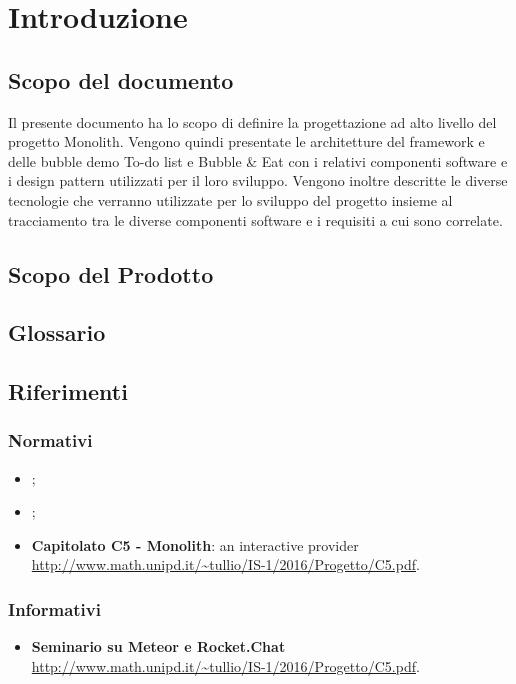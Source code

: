 \section{Introduzione}

\subsection{Scopo del documento}
Il presente documento ha lo scopo di definire la progettazione ad alto livello del progetto Monolith. Vengono quindi presentate le architetture del framework e delle bubble demo To-do list e Bubble \& Eat con i relativi componenti software e i design pattern utilizzati per il loro sviluppo. Vengono inoltre descritte le diverse tecnologie che verranno utilizzate per lo sviluppo del progetto insieme al tracciamento tra le diverse componenti software e i requisiti a cui sono correlate.

\subsection{Scopo del Prodotto}
\ScopoDelProdotto

\subsection{Glossario}
\GlossarioIntroduzione

\subsection{Riferimenti}
\subsubsection{Normativi}
\begin{itemize}
	\item \textbf{\NormeDiProgetto};
	\item \textbf{\AnalisiDeiRequisiti};
	\item \textbf{Capitolato C5 - Monolith}: an interactive 
	provider\\ \url{http://www.math.unipd.it/~tullio/IS-1/2016/Progetto/C5.pdf}.
\end{itemize}
\subsubsection{Informativi}
\begin{itemize}
	\item \textbf{Seminario su Meteor e Rocket.Chat}\\ \url{http://www.math.unipd.it/~tullio/IS-1/2016/Progetto/C5.pdf}.
\end{itemize}